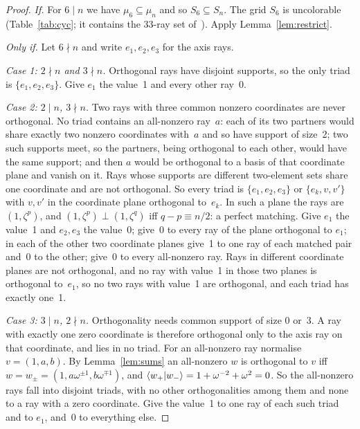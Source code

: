 \begin{proof}
\emph{If.}  For $6\mid n$ we have $\mu_6\subseteq\mu_n$ and so $S_6\subseteq S_n$.  The grid
$S_6$ is uncolorable (Table~\ref{tab:cyc}; it contains the 33-ray set
of~\cite{Cabello2025simplest}).  Apply Lemma~\ref{lem:restrict}.

\emph{Only if.}  Let $6\nmid n$ and write $e_1,e_2,e_3$ for the axis rays.

\emph{Case 1: $2\nmid n$ and $3\nmid n$.}  Orthogonal rays have disjoint supports, so the only
triad is $\{e_1,e_2,e_3\}$.  Give $e_1$ the value~1 and every other ray~0.

\emph{Case 2: $2\mid n$, $3\nmid n$.}  Two rays with three common nonzero coordinates are never
orthogonal.  No triad contains an all-nonzero ray~$a$: each of its two partners would share
exactly two nonzero coordinates with~$a$ and so have support of size~2; two such supports meet,
so the partners, being orthogonal to each other, would have the same support; and then $a$ would
be orthogonal to a basis of that coordinate plane and vanish on it.  Rays whose supports are
different two-element sets share one coordinate and are not orthogonal.  So every triad is
$\{e_1,e_2,e_3\}$ or $\{e_k,v,v'\}$ with $v,v'$ in the coordinate plane orthogonal to~$e_k$.  In
such a plane the rays are $(1,\zeta^p)$, and $(1,\zeta^p)\perp(1,\zeta^q)$ iff $q-p\equiv n/2$: a
perfect matching.  Give $e_1$ the value~1 and $e_2,e_3$ the value~0; give~0 to every ray of the
plane orthogonal to $e_1$; in each of the other two coordinate planes give~1 to one ray of each
matched pair and~0 to the other; give~0 to every all-nonzero ray.  Rays in different coordinate
planes are not orthogonal, and no ray with value~1 in those two planes is orthogonal to~$e_1$, so
no two rays with value~1 are orthogonal, and each triad has exactly one~1.

\emph{Case 3: $3\mid n$, $2\nmid n$.}  Orthogonality needs common support of size 0 or~3.  A ray
with exactly one zero coordinate is therefore orthogonal only to the axis ray on that coordinate,
and lies in no triad.  For an all-nonzero ray normalise $v=(1,a,b)$.  By Lemma~\ref{lem:sums} an
all-nonzero $w$ is orthogonal to $v$ iff $w=w_{\pm}=(1,a\omega^{\pm1},b\omega^{\mp1})$, and
$\langle w_+|w_-\rangle=1+\omega^{-2}+\omega^{2}=0$.  So the all-nonzero rays fall into disjoint
triads, with no other orthogonalities among them and none to a ray with a zero coordinate.  Give
the value~1 to one ray of each such triad and to $e_1$, and~0 to everything else.
\end{proof}

